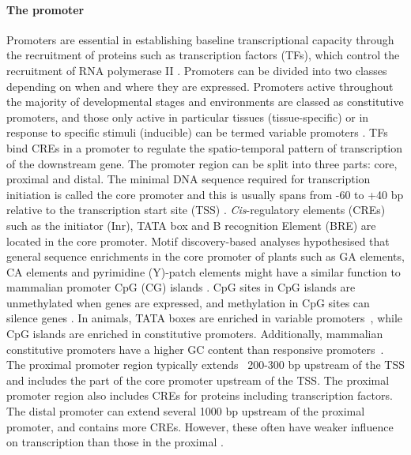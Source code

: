 \documentclass[../main.tex]{subfiles}
\begin{document}
\paragraph{The promoter}\label{chapter1:the-promoter}
Promoters are essential in establishing baseline transcriptional capacity through the recruitment of proteins such as transcription factors (TFs), which control the recruitment of RNA polymerase II \autocite{portoPlantPromotersApproach2014}.
Promoters can be divided into two classes depending on when and where they are expressed.
Promoters active throughout the majority of developmental stages and environments are classed as constitutive promoters, and those only active in particular tissues (tissue\hyp{}specific) or in response to specific stimuli (inducible) can be termed variable promoters \autocite{bilasCisregulatoryElementsUsed2016}.
TFs bind CREs in a promoter to regulate the spatio\hyp{}temporal pattern of transcription of the downstream gene.
The promoter region can be split into three parts: core, proximal and distal.
The minimal DNA sequence required for transcription initiation is called the core promoter and this is usually spans from -60 to +40 bp relative to the transcription start site (TSS) \autocite{solovyevIdentificationPromoterRegions2010,royCorePromotersTranscription2015}.
\textit{Cis}\hyp{}regulatory elements (CREs) such as the initiator (Inr), TATA box and B recognition Element (BRE) are located in the core promoter.
Motif discovery\hyp{}based analyses hypothesised that general sequence enrichments in the core promoter of plants such as GA elements, CA elements and pyrimidine (Y)\hyp{}patch elements might have a similar function to mammalian promoter CpG (CG) islands \autocite{yamamotoCharacteristicsCorePromoter2011,yamamotoHeterogeneityArabidopsisCore2009}.
CpG sites in CpG islands are unmethylated when genes are expressed, and methylation in CpG sites can silence genes \autocite{birdDNAMethylationPatterns2002}.
In animals, TATA boxes are enriched in variable promoters~\autocite{engstromGenomicRegulatoryBlocks2007,carninciGenomewideAnalysisMammalian2006}, while CpG islands are enriched in constitutive promoters.
Additionally, mammalian constitutive promoters have a higher GC content than responsive promoters~\autocite{vinogradovDNAHelixImportance2017, weiCharacterizationGenePromoters2019}.
The proximal promoter region typically extends ~200\hyp{}300 bp upstream of the TSS and includes the part of the core promoter upstream of the TSS. The proximal promoter region also includes CREs for proteins including transcription factors.
The distal promoter can extend several 1000 bp upstream of the proximal promoter, and contains more CREs. However, these often have weaker influence on transcription than those in the proximal \autocite{pandiarajanVivoPromoterEngineering2018}.
\end{document}
